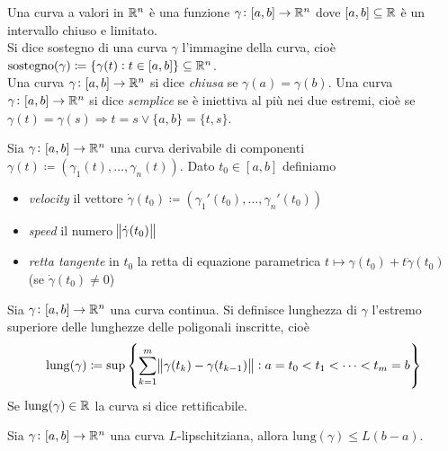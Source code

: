 
\begin{definition}
	Una curva a valori in $ \mathbb{R}^n $ è una funzione $ \gamma \colon [a, b] \to \mathbb{R}^n $ dove $ [a, b] \subseteq \mathbb{R} $ è un intervallo chiuso e limitato. \\
	Si dice sostegno di una curva $ \gamma $ l'immagine della curva, cioè $ \mathrm{sostegno}(\gamma) \coloneqq \{\gamma(t) : t \in [a, b]\} \subseteq \mathbb{R}^n $. \\
	Una curva $ \gamma \colon [a, b] \to \mathbb{R}^n $ si dice \emph{chiusa} se $ \gamma(a) = \gamma(b) $. Una curva $ \gamma \colon [a, b] \to \mathbb{R}^n $ si dice \emph{semplice} se è iniettiva al più nei due estremi, cioè se $ \gamma(t) = \gamma(s) \Rightarrow t = s \vee \{a, b\} = \{t, s\} $.
\end{definition}

\begin{definition}
	Sia $ \gamma \colon [a, b] \to \mathbb{R}^n $ una curva derivabile di componenti $ \gamma(t) \coloneqq (\gamma_1(t), \ldots, \gamma_n(t)) $. Dato $ t_0 \in [a, b] $ definiamo
	\begin{itemize}
		\item \emph{velocity} il vettore $ \dot{\gamma}(t_0) \coloneqq (\gamma_1'(t_0), \ldots, \gamma_n'(t_0)) $
		\item \emph{speed} il numero $ \norm{\dot{\gamma}(t_0)} $
		\item \emph{retta tangente} in $ t_0 $ la retta di equazione parametrica $ t \mapsto \gamma(t_0) + t \dot{\gamma}(t_0) $ (se $ \dot{\gamma}(t_0) \neq 0 $)
	\end{itemize}
\end{definition}

\begin{definition}
	Sia $ \gamma \colon [a, b] \to \mathbb{R}^n $ una curva continua. Si definisce lunghezza di $ \gamma $ l'estremo superiore delle lunghezze delle poligonali inscritte, cioè
	\begin{equation}
		\mathrm{lung}(\gamma) \coloneqq \sup{\left\{\sum_{k = 1}^{m} \norm{\gamma(t_k) - \gamma(t_{k - 1})} : a = t_0 < t_1 < \cdots < t_m = b\right\}}
	\end{equation}
	Se $ \mathrm{lung}(\gamma) \in \mathbb{R} $ la curva si dice rettificabile.
\end{definition}

\begin{prop}
	Sia $ \gamma \colon [a, b] \to \mathbb{R}^n $ una curva $ L $-lipschitziana, allora $ \mathrm{lung}(\gamma) \leq L (b - a) $.
\end{prop}

